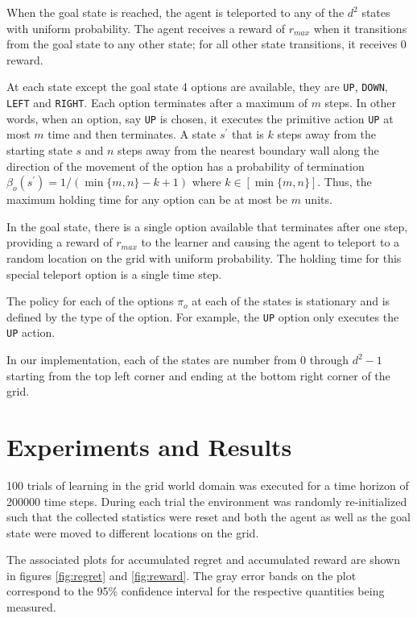 When the goal state is reached, the agent is teleported to any of the $d^2$ states with uniform probability.
The agent receives a reward of $r_{max}$ when it transitions from the goal state to any other state; for all other state transitions, it receives 0 reward.

At each state except the goal state 4 options are available, they are \texttt{UP}, \texttt{DOWN}, \texttt{LEFT} and \texttt{RIGHT}.
Each option terminates after a maximum of $m$ steps. 
In other words, when an option, say \texttt{UP} is chosen, it executes the primitive action \texttt{UP} at most $m$ time and then terminates.
A state $s^\prime$ that is $k$ steps away from the starting state $s$ and $n$ steps away from the nearest boundary wall along the direction of the movement of the option has a probability of termination $\beta_o(s^\prime) = 1/(\min\{m, n\} - k + 1)$ where $k \in [\min\{m, n\}]$.
Thus, the maximum holding time for any option can be at most be $m$ units.

In the goal state, there is a single option available that terminates after one step, providing a reward of $r_{max}$ to the learner and causing the agent to teleport to a random location on the grid with uniform probability.
The holding time for this special teleport option is a single time step.

The policy for each of the options $\pi_o$ at each of the states is stationary and is defined by the type of the option.
For example, the \texttt{UP} option only executes the \texttt{UP} action.

In our implementation, each of the states are number from 0 through $d^2 - 1$ starting from the top left corner and ending at the bottom right corner of the grid.


\section{Experiments and Results}

100 trials of learning in the grid world domain was executed for a time horizon of 200000 time steps.
During each trial the environment was randomly re-initialized such that the collected statistics were reset and both the agent as well as the goal state were moved to different locations on the grid.

The associated plots for accumulated regret and accumulated reward are shown in figures \ref{fig:regret} and  \ref{fig:reward}.
The gray error bands on the plot correspond to the 95\% confidence interval for the respective quantities being measured.

